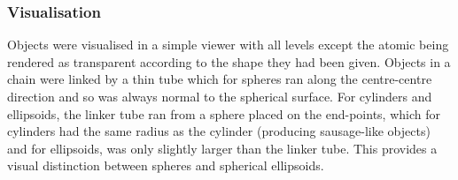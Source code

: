 \subsubsection{Visualisation}

Objects were visualised in a simple viewer with all levels except the atomic being
rendered as transparent according to the shape they had been given.  Objects in a
chain were linked by a thin tube which for spheres ran along the centre-centre
direction and so was always normal to the spherical surface.  For cylinders and
ellipsoids, the linker tube ran from a sphere placed on the end-points, which for
cylinders had the same radius as the cylinder (producing sausage-like objects)
and for ellipsoids, was only slightly larger than the linker tube.  This provides 
a visual distinction between spheres and spherical ellipsoids. 
